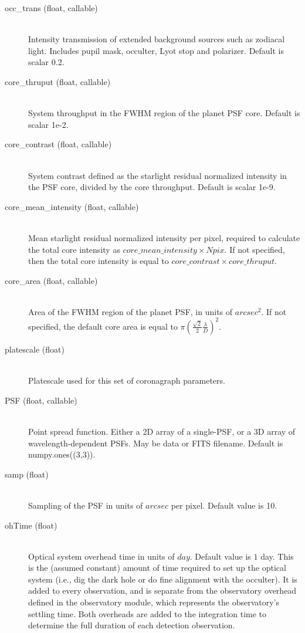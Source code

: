 \documentclass[cleanfoot]{asme2ej}
\begin{document}
\begin{itemize}
\begin{description}
\begin{description}
        \item[occ\_trans (float, callable)] \hfill \\ Intensity transmission of extended background sources such as zodiacal light. Includes pupil mask, occulter, Lyot stop and polarizer. Default is scalar 0.2.
        \item[core\_thruput (float, callable)] \hfill \\ System throughput in the FWHM region of the planet PSF core. Default is scalar 1e-2.
        \item[core\_contrast (float, callable)] \hfill \\ System contrast defined as the starlight residual normalized intensity in the PSF core, divided by the core throughput. Default is scalar 1e-9.
        \item[core\_mean\_intensity (float, callable)] \hfill \\ Mean starlight residual normalized intensity per pixel, required to calculate the total core intensity as $core\_mean\_intensity \times Npix$. If not specified, then the total core intensity is equal to $core\_contrast \times core\_thruput$.
        \item[core\_area (float, callable)] \hfill \\ Area of the FWHM region of the planet PSF, in units of $ arcsec^2 $. If not specified, the default core area is equal to $\pi\left(\frac{\sqrt 2}{2}\frac{\lambda}{D}\right)^2$.
        \item[platescale (float)] \hfill \\ Platescale used for this set of coronagraph parameters.
        \item[PSF (float, callable)] \hfill \\ Point spread function. Either a 2D array of a single-PSF, or a 3D array of wavelength-dependent PSFs. May be data or FITS filename. Default is numpy.ones((3,3)).
        \item[samp (float)] \hfill \\ Sampling of the PSF in units of $ arcsec $ per pixel. Default value is 10.
        \item[ohTime (float)] \hfill \\ Optical system overhead time in units of $ day $.  Default value is $ 1 $ day.  This is the (assumed constant) amount of time required to set up the optical system (i.e., dig the dark hole or do fine alignment with the occulter).  It is added to every observation, and is separate from the observatory overhead defined in the observatory module, which represents the observatory's settling time.  Both overheads are added to the integration time to determine the full duration of each detection observation.

\end{description}
\end{description}
\end{itemize}
\end{document}
